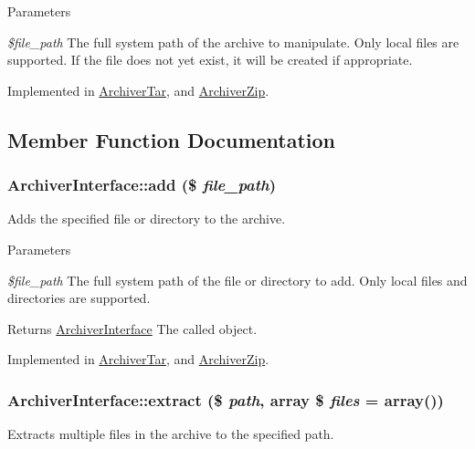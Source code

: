 \begin{DoxyParams}{Parameters}
\item[{\em \$file\_\-path}]The full system path of the archive to manipulate. Only local files are supported. If the file does not yet exist, it will be created if appropriate. \end{DoxyParams}


Implemented in \hyperlink{classArchiverTar_af3727d4c5fa466d4aabde81bb9d4c7df}{ArchiverTar}, and \hyperlink{classArchiverZip_adfe750d331bb6910529f1326bdab2947}{ArchiverZip}.

\subsection{Member Function Documentation}
\hypertarget{interfaceArchiverInterface_aedd1c39f36b45e2f12381003d83ee4bf}{
\subsubsection[{add}]{\setlength{\rightskip}{0pt plus 5cm}ArchiverInterface::add (\$ {\em file\_\-path})}}
\label{interfaceArchiverInterface_aedd1c39f36b45e2f12381003d83ee4bf}
Adds the specified file or directory to the archive.


\begin{DoxyParams}{Parameters}
\item[{\em \$file\_\-path}]The full system path of the file or directory to add. Only local files and directories are supported.\end{DoxyParams}
\begin{DoxyReturn}{Returns}
\hyperlink{interfaceArchiverInterface}{ArchiverInterface} The called object. 
\end{DoxyReturn}


Implemented in \hyperlink{classArchiverTar_a23c343bebf4ba3a61fc8087427406bbe}{ArchiverTar}, and \hyperlink{classArchiverZip_a9f16632d5096932af9b0483f678c192c}{ArchiverZip}.\hypertarget{interfaceArchiverInterface_a6537e95c432eeedfdc5c72342a40eab2}{
\subsubsection[{extract}]{\setlength{\rightskip}{0pt plus 5cm}ArchiverInterface::extract (\$ {\em path}, \/  array \$ {\em files} = {\ttfamily array()})}}
\label{interfaceArchiverInterface_a6537e95c432eeedfdc5c72342a40eab2}
Extracts multiple files in the archive to the specified path.


